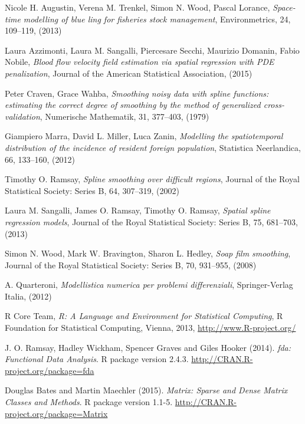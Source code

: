 \documentclass[a4paper,11pt,twoside,openright]{book}							%
\begin{document}
\begin{thebibliography}{99}

Nicole H. Augustin, Verena M. Trenkel, Simon N. Wood, Pascal Lorance, \emph{Space-time modelling of blue ling for fisheries stock management}, Environmetrics, 24, 109–119, (2013)

Laura Azzimonti, Laura M. Sangalli, Piercesare Secchi, Maurizio Domanin, Fabio Nobile, \emph{Blood flow velocity field estimation via spatial regression with PDE penalization}, Journal of the American Statistical Association, (2015)

Peter Craven, Grace Wahba, \emph{Smoothing noisy data with spline functions: estimating the correct degree of smoothing by the method of generalized cross-validation}, Numerische Mathematik, 31, 377–403, (1979)

Giampiero Marra, David L. Miller, Luca Zanin, \emph{Modelling the spatiotemporal distribution of the incidence of resident foreign population}, Statistica Neerlandica, 66, 133–160, (2012)

Timothy O. Ramsay, \emph{Spline smoothing over difficult regions}, Journal of the Royal Statistical Society: Series B, 64, 307–319, (2002)

Laura M. Sangalli, James O. Ramsay, Timothy O. Ramsay, \emph{Spatial spline regression models}, Journal of the Royal Statistical Society: Series B, 75, 681–703, (2013)

Simon N. Wood, Mark W. Bravington, Sharon L. Hedley, \emph{Soap film smoothing}, Journal of the Royal Statistical Society: Series B, 70, 931–955, (2008)

A. Quarteroni, \emph{Modellistica numerica per problemi differenziali}, Springer-Verlag Italia, (2012)

R Core Team, \emph{R: A Language and Environment for Statistical Computing}, R Foundation for Statistical Computing, Vienna, 2013, \href{http://www.R-project.org/}{http://www.R-project.org/}


J. O. Ramsay, Hadley Wickham, Spencer Graves and Giles Hooker (2014). \emph{fda: Functional Data Analysis}. R package version 2.4.3. \href{http://CRAN.R-project.org/package=fda}{http://CRAN.R-project.org/package=fda}

Douglas Bates and Martin Maechler (2015). \emph{Matrix: Sparse and Dense Matrix Classes and Methods}. R package version 1.1-5. \href{http://CRAN.R-project.org/package=Matrix}{http://CRAN.R-project.org/package=Matrix}


\end{thebibliography}
\end{document}
